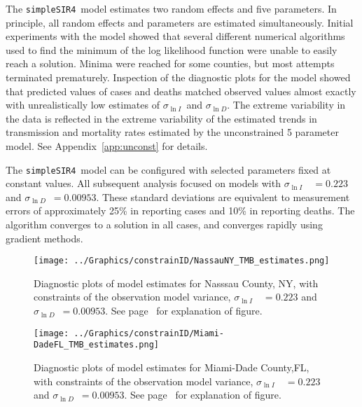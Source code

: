 \documentclass[12pt,letterpaper]{article}
\newcommand\SSm{{\tt simpleSIR4}}
\newcommand\slI{$\sigma_{\ln I}$\ }
\newcommand\slD{$\sigma_{\ln D}$}
\begin{document}
The \SSm\  model estimates two random effects and five parameters.
In principle, all random effects and parameters are estimated
simultaneously.
Initial experiments with the model showed that several different
numerical algorithms used to find the minimum of the log likelihood
function were unable to easily reach a solution. Minima were reached
for some counties, but most attempts terminated prematurely. 
Inspection of the diagnostic plots for the model showed that predicted
values of cases and deaths matched observed values almost exactly
with unrealistically low estimates of \slI and \slD.
The extreme variability in the data is reflected in the extreme
variability of the estimated trends in transmission and mortality
rates estimated by the unconstrained 5 parameter model.
See Appendix~\ref{app:unconst} for details.

The \SSm\ model can be configured with selected parameters fixed at
constant values. 
All subsequent analysis focused on models with 
\slI~$ = 0.223$ and \slD~$= 0.00953$. 
These standard deviations are equivalent to measurement errors of
approximately 25\% in reporting cases and 10\% in reporting deaths.
The algorithm converges to a solution in all cases, and converges
rapidly using gradient methods.

\begin{figure}
\begin{center}
\texttt{[image: ../Graphics/constrainID/NassauNY\_TMB\_estimates.png]}
\end{center}
\caption{\label{fig:estsNaNYc}
Diagnostic plots of model estimates for Nasssau County, NY, 
with constraints of the observation model variance, 
\slI~$ = 0.223$ and \slD~$= 0.00953$. 
See page~\pageref{pp:diagexpl} for explanation of figure.
}
\end{figure}

\begin{figure}
\begin{center}
\texttt{[image: ../Graphics/constrainID/Miami-DadeFL\_TMB\_estimates.png]}
\end{center}
\caption{\label{fig:estsMDFLc}
Diagnostic plots of model estimates for Miami-Dade County,FL,
with constraints of the observation model variance, 
\slI~$ = 0.223$ and \slD~$= 0.00953$. 
See page~\pageref{pp:diagexpl} for explanation of figure.
}
\end{figure}
\end{document}
